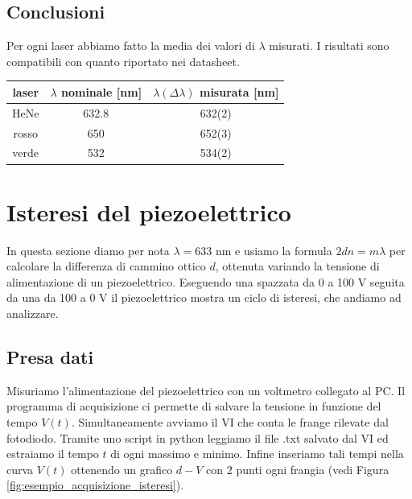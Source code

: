 \documentclass[a4paper]{article}
\begin{document}
\begin{multicols}{2}

\subsection{Conclusioni}
Per ogni laser abbiamo fatto la media dei valori di $\lambda$ misurati.
I risultati sono compatibili con quanto riportato nei datasheet. 

\begin{table}[H]
	\centering
	\begin{tabular}{|c|c|c|}
		\hline
		laser &$\lambda$ nominale [nm]& $\lambda(\Delta\lambda)$ misurata [nm]\\
		\hline
		HeNe & 632.8 & 632(2)\\
		rosso & 650 & 652(3)\\
		verde & 532 & 534(2)\\
		\hline
	\end{tabular}
\end{table}

\section{Isteresi del piezoelettrico}

In questa sezione diamo per nota $\lambda = 633$ nm e usiamo la formula $2dn = m\lambda$ per calcolare la differenza di cammino ottico $d$, ottenuta variando la tensione di alimentazione di un piezoelettrico. Eseguendo una spazzata da 0 a 100 V seguita da una da 100 a 0 V il piezoelettrico mostra un ciclo di isteresi, che andiamo ad analizzare.

\subsection{Presa dati}
Misuriamo l'alimentazione del piezoelettrico con un voltmetro collegato al PC. Il programma di acquisizione ci permette di salvare la tensione in funzione del tempo $V(t)$.
Simultaneamente avviamo il VI che conta le frange rilevate dal fotodiodo. Tramite uno script in python leggiamo il file .txt salvato dal VI ed estraiamo il tempo $t$ di ogni massimo e minimo. Infine inseriamo tali tempi nella curva $V(t)$ ottenendo un grafico $d-V$ con 2 punti ogni frangia (vedi Figura \ref{fig:esempio_acquisizione_isteresi}).


\end{multicols}
\end{document}
